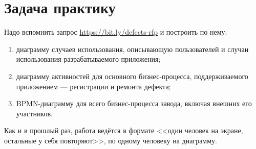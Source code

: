 \documentclass{../mcstext}
\begin{document}
\maketitle
\thispagestyle{empty}

\section{Задача практику}

Надо вспомнить запрос \url{https://bit.ly/defects-rfp} и построить по нему:

\begin{enumerate}
    \item диаграмму случаев использования, описывающую пользователей и случаи использования разрабатываемого приложения;
    \item диаграмму активностей для основного бизнес-процесса, поддерживаемого приложением --- регистрации и ремонта дефекта;
    \item BPMN-диаграмму для всего бизнес-процесса завода, включая внешних его участников.
\end{enumerate}

Как и в прошлый раз, работа ведётся в формате <<один человек на экране, остальные у себя повторяют>>, по одному человеку на диаграмму.
\end{document}
